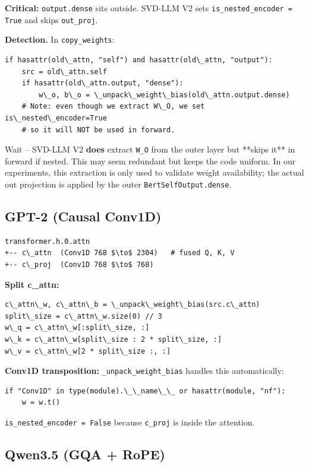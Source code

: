 \textbf{Critical:} \texttt{output.dense} sits outside. SVD-LLM V2 sets 
\texttt{is\_nested\_encoder = True} and skips \texttt{out\_proj}.

\textbf{Detection.} In \texttt{copy\_weights}:

\begin{lstlisting}
if hasattr(old\_attn, "self") and hasattr(old\_attn, "output"):
    src = old\_attn.self
    if hasattr(old\_attn.output, "dense"):
        w\_o, b\_o = \_unpack\_weight\_bias(old\_attn.output.dense)
    # Note: even though we extract W\_O, we set is\_nested\_encoder=True
    # so it will NOT be used in forward.
\end{lstlisting}

Wait -- SVD-LLM V2 \textbf{does} extract \texttt{W\_O} from the outer layer but **skips 
it** in forward if nested. This may seem redundant but keeps the code 
uniform. In our experiments, this extraction is only used to validate 
weight availability; the actual out projection is applied by the outer 
\texttt{BertSelfOutput.dense}.

\subsection{GPT-2 (Causal Conv1D)}

\begin{lstlisting}
transformer.h.0.attn
+-- c\_attn  (Conv1D 768 $\to$ 2304)   # fused Q, K, V
+-- c\_proj  (Conv1D 768 $\to$ 768)
\end{lstlisting}

\textbf{Split c\_attn:}

\begin{lstlisting}
c\_attn\_w, c\_attn\_b = \_unpack\_weight\_bias(src.c\_attn)
split\_size = c\_attn\_w.size(0) // 3
w\_q = c\_attn\_w[:split\_size, :]
w\_k = c\_attn\_w[split\_size : 2 * split\_size, :]
w\_v = c\_attn\_w[2 * split\_size :, :]
\end{lstlisting}

\textbf{Conv1D transposition:} \texttt{\_unpack\_weight\_bias} handles this automatically:

\begin{lstlisting}
if "Conv1D" in type(module).\_\_name\_\_ or hasattr(module, "nf"):
    w = w.t()
\end{lstlisting}

\texttt{is\_nested\_encoder = False} because \texttt{c\_proj} is inside the attention.

\subsection{Qwen3.5 (GQA + RoPE)}

